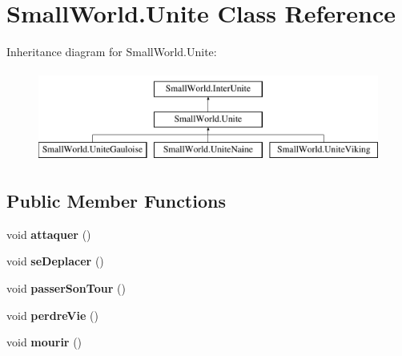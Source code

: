 \hypertarget{class_small_world_1_1_unite}{\section{Small\-World.\-Unite Class Reference}
\label{class_small_world_1_1_unite}
}
Inheritance diagram for Small\-World.\-Unite\-:\begin{figure}[H]
\begin{center}
\leavevmode
\includegraphics[height=3.000000cm]{class_small_world_1_1_unite}
\end{center}
\end{figure}
\subsection*{Public Member Functions}
\begin{DoxyCompactItemize}
\item 
\hypertarget{class_small_world_1_1_unite_a5e792891c8194bd5344cf1d3a897226a}{void {\bfseries attaquer} ()}\label{class_small_world_1_1_unite_a5e792891c8194bd5344cf1d3a897226a}

\item 
\hypertarget{class_small_world_1_1_unite_a1875521bf39ac2aff471f22d36dc232a}{void {\bfseries se\-Deplacer} ()}\label{class_small_world_1_1_unite_a1875521bf39ac2aff471f22d36dc232a}

\item 
\hypertarget{class_small_world_1_1_unite_ac29b97bf257cf976f9bfa7cc10db5d10}{void {\bfseries passer\-Son\-Tour} ()}\label{class_small_world_1_1_unite_ac29b97bf257cf976f9bfa7cc10db5d10}

\item 
\hypertarget{class_small_world_1_1_unite_a42531987ed9bb51d96727f2b066b53fa}{void {\bfseries perdre\-Vie} ()}\label{class_small_world_1_1_unite_a42531987ed9bb51d96727f2b066b53fa}

\item 
\hypertarget{class_small_world_1_1_unite_aeb8d0a0147899c02dd175a80b7e227e6}{void {\bfseries mourir} ()}\label{class_small_world_1_1_unite_aeb8d0a0147899c02dd175a80b7e227e6}

\end{DoxyCompactItemize}
